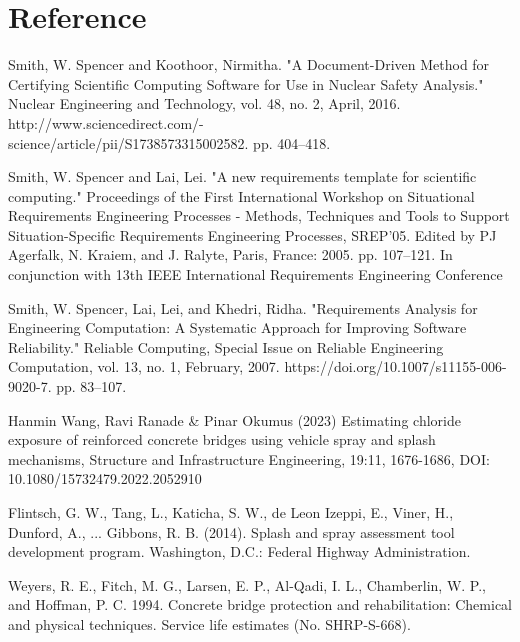 \documentclass[12pt]{article}
\newcounter{refnum} %
\begin{document}
\section*{Reference}
\begin{enumerate}[label={[\arabic*]}]
\item {} \label{ref1}
Smith, W. Spencer and Koothoor, Nirmitha. "A Document-Driven Method for Certifying Scientific Computing Software for Use in Nuclear Safety Analysis." Nuclear Engineering and Technology, vol. 48, no. 2, April, 2016. http://www.sciencedirect.com/-\\science/article/pii/S1738573315002582. pp. 404–418.

\item {} \label{ref2}
Smith, W. Spencer and Lai, Lei. "A new requirements template for scientific computing." Proceedings of the First International Workshop on Situational Requirements Engineering Processes - Methods, Techniques and Tools to Support Situation-Specific Requirements Engineering Processes, SREP'05. Edited by PJ Agerfalk, N. Kraiem, and J. Ralyte, Paris, France: 2005. pp. 107–121. In conjunction with 13th IEEE International Requirements Engineering Conference

\item {} \label{ref3}
Smith, W. Spencer, Lai, Lei, and Khedri, Ridha. "Requirements Analysis for Engineering Computation: A Systematic Approach for Improving Software Reliability." Reliable Computing, Special Issue on Reliable Engineering Computation, vol. 13, no. 1, February, 2007. https://doi.org/10.1007/s11155-006-9020-7. pp. 83–107.

\item {} \label{ref4}
Hanmin Wang, Ravi Ranade \& Pinar Okumus (2023) Estimating chloride exposure of reinforced concrete bridges using vehicle spray and splash mechanisms, Structure and Infrastructure Engineering, 19:11, 1676-1686, DOI: 10.1080/15732479.2022.2052910

\item {} \label{ref5}
Flintsch, G. W., Tang, L., Katicha, S. W., de Leon Izeppi, E., Viner, H., Dunford, A., ... Gibbons, R. B. (2014). Splash and spray assessment tool development program. Washington, D.C.: Federal Highway Administration.

\item {} \label{ref6}
Weyers, R. E., Fitch, M. G., Larsen, E. P., Al-Qadi, I. L., Chamberlin, W. P., and Hoffman, P.  C. 1994. Concrete bridge protection and rehabilitation: Chemical and physical techniques. Service life estimates (No. SHRP-S-668).


\end{enumerate}
\end{document}
